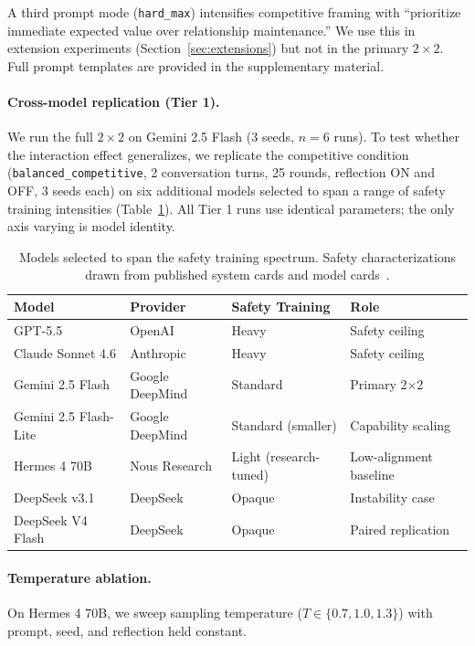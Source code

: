 \documentclass{article}
\begin{document}
A third prompt mode (\texttt{hard\_max}) intensifies competitive framing with ``prioritize immediate expected value over relationship maintenance.'' We use this in extension experiments (Section~\ref{sec:extensions}) but not in the primary $2 \times 2$. Full prompt templates are provided in the supplementary material.

\paragraph{Cross-model replication (Tier 1).} We run the full $2 \times 2$ on Gemini 2.5 Flash (3 seeds, $n{=}6$ runs). To test whether the interaction effect generalizes, we replicate the competitive condition (\texttt{balanced\_competitive}, 2 conversation turns, 25 rounds, reflection ON and OFF, 3 seeds each) on six additional models selected to span a range of safety training intensities (Table~\ref{tab:models}). All Tier 1 runs use identical parameters; the only axis varying is model identity.

\begin{table}[h]
\centering
\footnotesize
\begin{tabular}{llll}
\toprule
Model & Provider & Safety Training & Role \\
\midrule
GPT-5.5 & OpenAI & Heavy & Safety ceiling \\
Claude Sonnet 4.6 & Anthropic & Heavy & Safety ceiling \\
Gemini 2.5 Flash & Google DeepMind & Standard & Primary 2$\times$2 \\
Gemini 2.5 Flash-Lite & Google DeepMind & Standard (smaller) & Capability scaling \\
Hermes 4 70B & Nous Research & Light (research-tuned) & Low-alignment baseline \\
DeepSeek v3.1 & DeepSeek & Opaque & Instability case \\
DeepSeek V4 Flash & DeepSeek & Opaque & Paired replication \\
\bottomrule
\end{tabular}
\caption{Models selected to span the safety training spectrum. Safety characterizations drawn from published system cards and model cards~\cite{mitchell2019model}.}
\label{tab:models}
\end{table}

\paragraph{Temperature ablation.} On Hermes 4 70B, we sweep sampling temperature ($T \in \{0.7, 1.0, 1.3\}$) with prompt, seed, and reflection held constant.
\end{document}
